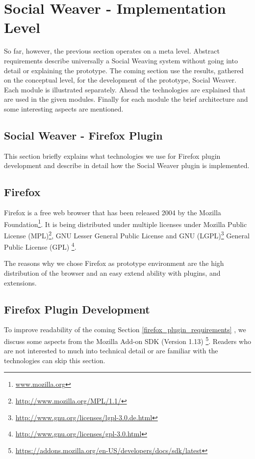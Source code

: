 \section{Social Weaver - Implementation Level}\label{sowe-concrete}
So far, however, the previous section operates on a meta level. Abstract requirements describe universally a Social Weaving system without going into detail or explaining the prototype. The coming section use the results, gathered on the conceptual level, for the development of the prototype, Social Weaver. 
Each module is illustrated separately. Ahead the technologies are explained that are used in the given modules. Finally for each module the brief architecture and some interesting aspects are mentioned. 

\subsection{Social Weaver - Firefox Plugin} \label{sowe-firefox}
This section briefly explains what technologies we use for Firefox plugin development and describe in detail how the Social Weaver plugin is implemented.

\subsection*{Firefox}
Firefox is a free web browser that has been released 2004 by the Mozilla Foundation\footnote{\url{www.mozilla.org}}. It is being distributed under multiple licenses under Mozilla Public License (MPL)\footnote{\url{http://www.mozilla.org/MPL/1.1/}}, GNU Lesser General Public License and GNU (LGPL)\footnote{\url{http://www.gnu.org/licenses/lgpl-3.0.de.html}} General Public License (GPL) \footnote{\url{http://www.gnu.org/licenses/gpl-3.0.html}}. 

The reasons why we chose Firefox as prototype environment are the high distribution of the browser and an easy extend ability with plugins, and extensions.

\subsection*{Firefox Plugin Development}
To improve readability of the coming Section \ref{firefox_plugin_requirements} , we discuss some aspects from the Mozilla Add-on SDK (Version 1.13) \footnote{\url{https://addons.mozilla.org/en-US/developers/docs/sdk/latest}}. Readers who are not interested to much into technical detail or are familiar with the technologies can skip this section.

